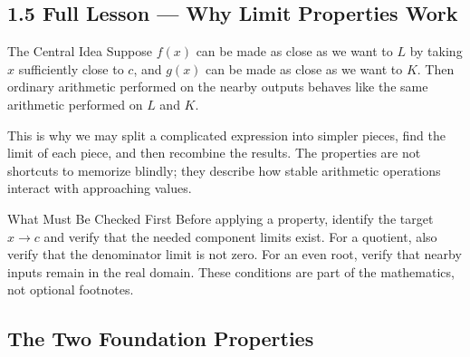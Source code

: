 \documentclass[11pt]{article}
\begin{document}
%
%
%
%
\newpage
\subsection*{1.5 Full Lesson --- Why Limit Properties Work}

\begin{bigideabox}{The Central Idea}
Suppose $f(x)$ can be made as close as we want to $L$ by taking $x$ sufficiently close to $c$, and $g(x)$ can be made as close as we want to $K$. Then ordinary arithmetic performed on the nearby outputs behaves like the same arithmetic performed on $L$ and $K$.

This is why we may split a complicated expression into simpler pieces, find the limit of each piece, and then recombine the results. The properties are not shortcuts to memorize blindly; they describe how stable arithmetic operations interact with approaching values.
\end{bigideabox}

\begin{center}
\end{center}

\begin{notebox}{What Must Be Checked First}
Before applying a property, identify the target $x\to c$ and verify that the needed component limits exist. For a quotient, also verify that the denominator limit is not zero. For an even root, verify that nearby inputs remain in the real domain. These conditions are part of the mathematics, not optional footnotes.
\end{notebox}

\newpage
\subsection*{The Two Foundation Properties}
\end{document}

